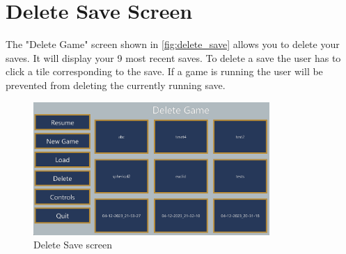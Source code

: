 \section{Delete Save Screen} \label{delete_save_screen}
The "Delete Game" screen shown in \autoref{fig:delete_save} allows you to delete your saves.
It will display your 9 most recent saves.
To delete a save the user has to click a tile corresponding to the save.
If a game is running the user will be prevented from deleting the currently running save.

\begin{figure}[H]
    \centering
    \includegraphics[width=0.8\textwidth]{chapters/user_manual/resources/delete-game.png}
    \caption{Delete Save screen}
    \label{fig:delete_save}
\end{figure}